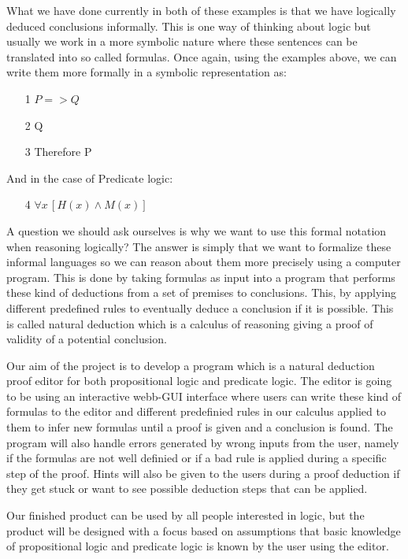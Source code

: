 What we have done currently in both of these examples is that we have logically deduced conclusions informally. This is one way of thinking about logic but usually we work in a more
symbolic nature where these sentences can be translated into so called formulas. Once again, using the examples above, we can write them more formally in a symbolic representation as:

\begin{itemize}
    \item [1] $P => Q$
    \item [2] Q
    \item [3] Therefore P
\end{itemize}

\noindent And in the case of Predicate logic:

\begin{itemize}
    \item [4] $ \forall x \, [H(x) \wedge M(x)]$
\end{itemize}


\noindent A question we should ask ourselves is why we want to use this formal notation when reasoning logically? The answer is simply that we want to formalize these informal languages so we can reason about them more precisely using a computer program. This is done by taking formulas as input into a 
program that performs these kind of deductions from a set of premises to conclusions. This, by applying different predefined rules to eventually deduce a conclusion if it is possible. This is called natural 
deduction which is a calculus of reasoning giving a proof of validity of a potential conclusion.

Our aim of the project is to develop a program which is a natural deduction proof editor for both propositional logic and predicate logic. The editor is going to be using an interactive webb-GUI interface where users can write these kind of formulas to the editor and different predefinied rules in our calculus applied to them to infer new formulas until
a proof is given and a conclusion is found. The program will also handle errors generated by wrong inputs from the user, namely if the formulas are not well definied or if a bad rule is applied during a specific step of the proof. Hints will also be given to the users during a proof deduction if they get stuck or want to see possible deduction steps that can be applied.

Our finished product can be used by all people interested in logic, but the product will be designed with a focus based on assumptions that basic knowledge of propositional logic and predicate logic is known by the user using the editor. 